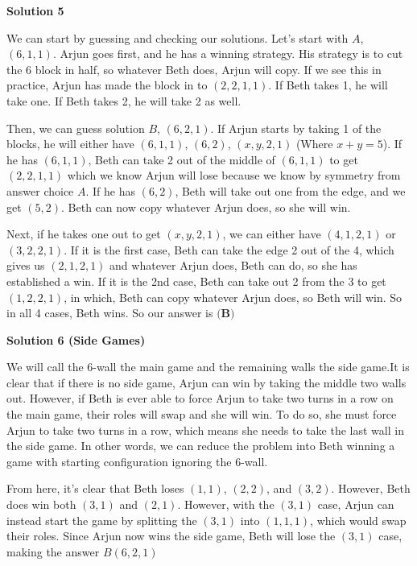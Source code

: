 \begin{enumerate}
 



\textbf{Solution 5}

We can start by guessing and checking our solutions. Let's start with $A$, $(6,1,1)$. Arjun goes first, and he has a winning strategy. His strategy is to cut the 6 block in half, so whatever Beth does, Arjun will copy. If we see this in practice, Arjun has made the block in to $(2,2,1,1)$. If Beth takes 1, he will take one. If Beth takes 2, he will take 2 as well.

 Then, we can guess solution $B$, $(6,2,1)$. If Arjun starts by taking 1 of the blocks, he will either have $(6,1,1)$, $(6,2)$, $(x,y,2,1)$ (Where $x+y = 5$). If he has $(6,1,1)$, Beth can take 2 out of the middle of $(6,1,1)$ to get $(2,2,1,1)$ which we know Arjun will lose because we know by symmetry from answer choice $A$. If he has $(6,2)$, Beth will take out one from the edge, and we get $(5,2)$. Beth can now copy whatever Arjun does, so she will win. 

 Next, if he takes one out to get $(x,y,2,1)$, we can either have $(4,1,2,1)$ or $(3,2,2,1)$. If it is the first case, Beth can take the edge 2 out of the 4, which gives us $(2,1,2,1)$ and whatever Arjun does, Beth can do, so she has established a win. If it is the 2nd case, Beth can take out 2 from the 3 to get $(1,2,2,1)$, in which, Beth can copy whatever Arjun does, so Beth will win. So in all 4 cases, Beth wins. So our answer is  $\boxed{\textbf{(B)}}$




\textbf{Solution 6 (Side Games)}

We will call the $6$-wall the main game and the remaining walls the side game.It is clear that if there is no side game, Arjun can win by taking the middle two walls out. However, if Beth is ever able to force Arjun to take two turns in a row on the main game, their roles will swap and she will win. To do so, she must force Arjun to take two turns in a row, which means she needs to take the last wall in the side game. In other words, we can reduce the problem into Beth winning a game with starting configuration ignoring the $6$-wall.

 From here, it's clear that Beth loses $(1,1)$, $(2,2)$, and $(3,2)$. However, Beth does win both $(3,1)$ and $(2,1)$. However, with the $(3,1)$ case, Arjun can instead start the game by splitting the $(3,1)$ into $(1, 1, 1)$, which would swap their roles. Since Arjun now wins the side game, Beth will lose the $(3,1)$ case, making the answer $\boxed{B(6, 2, 1)}$





\end{enumerate}
